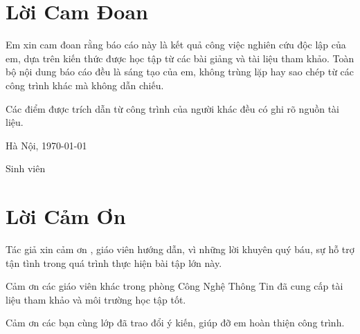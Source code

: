 






\frontmatter

\tableofcontents
\cleardoublepage

\listoffigures
\cleardoublepage

\listoftables
\cleardoublepage

\chapter*{Lời Cam Đoan}

Em xin cam đoan rằng báo cáo này là kết quả công việc nghiên cứu độc lập của em, dựa trên kiến thức được học tập từ các bài giảng và tài liệu tham khảo. Toàn bộ nội dung báo cáo đều là sáng tạo của em, không trùng lặp hay sao chép từ các công trình khác mà không dẫn chiếu.

Các điểm được trích dẫn từ công trình của người khác đều có ghi rõ nguồn tài liệu.

\vspace{2cm}

Hà Nội, \today

\hspace{3cm} Sinh viên

\vspace{2cm}

\hspace{3cm} \svname

\cleardoublepage

\chapter*{Lời Cảm Ơn}

Tác giả xin cảm ơn \gvname{}, giáo viên hướng dẫn, vì những lời khuyên quý báu, sự hỗ trợ tận tình trong quá trình thực hiện bài tập lớn này.

Cảm ơn các giáo viên khác trong phòng Công Nghệ Thông Tin đã cung cấp tài liệu tham khảo và môi trường học tập tốt.

Cảm ơn các bạn cùng lớp đã trao đổi ý kiến, giúp đỡ em hoàn thiện công trình.

